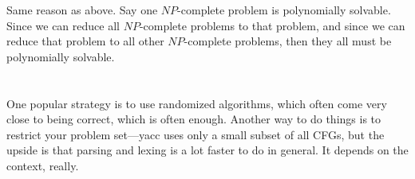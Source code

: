 \documentclass[a4paper]{article}
\begin{document}
Same reason as above. Say one $NP$-complete problem is polynomially solvable. Since we can reduce all $NP$-complete problems to that problem, and since we can reduce that problem to all other $NP$-complete problems, then they all must be polynomially solvable.

\section{}

One popular strategy is to use randomized algorithms, which often come very close to being correct, which is often enough. Another way to do things is to restrict your problem set---yacc uses only a small subset of all CFGs, but the upside is that parsing and lexing is a lot faster to do in general. It depends on the context, really.
\end{document}
